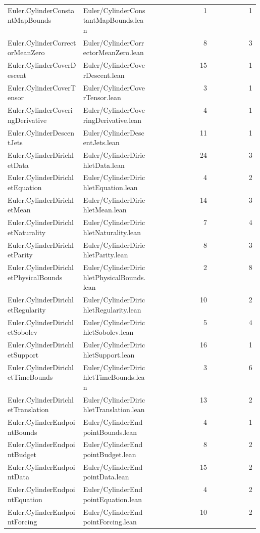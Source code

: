 \begin{longtable}{p{0.30\linewidth}p{0.28\linewidth}rr}
Euler.CylinderConstantMapBounds & Euler/CylinderConstantMapBounds.lean & 1 & 1\\
Euler.CylinderCorrectorMeanZero & Euler/CylinderCorrectorMeanZero.lean & 8 & 3\\
Euler.CylinderCoverDescent & Euler/CylinderCoverDescent.lean & 15 & 1\\
Euler.CylinderCoverTensor & Euler/CylinderCoverTensor.lean & 3 & 1\\
Euler.CylinderCoveringDerivative & Euler/CylinderCoveringDerivative.lean & 4 & 1\\
Euler.CylinderDescentJets & Euler/CylinderDescentJets.lean & 11 & 1\\
Euler.CylinderDirichletData & Euler/CylinderDirichletData.lean & 24 & 3\\
Euler.CylinderDirichletEquation & Euler/CylinderDirichletEquation.lean & 4 & 2\\
Euler.CylinderDirichletMean & Euler/CylinderDirichletMean.lean & 14 & 3\\
Euler.CylinderDirichletNaturality & Euler/CylinderDirichletNaturality.lean & 7 & 4\\
Euler.CylinderDirichletParity & Euler/CylinderDirichletParity.lean & 8 & 3\\
Euler.CylinderDirichletPhysicalBounds & Euler/CylinderDirichletPhysicalBounds.lean & 2 & 8\\
Euler.CylinderDirichletRegularity & Euler/CylinderDirichletRegularity.lean & 10 & 2\\
Euler.CylinderDirichletSobolev & Euler/CylinderDirichletSobolev.lean & 5 & 4\\
Euler.CylinderDirichletSupport & Euler/CylinderDirichletSupport.lean & 16 & 1\\
Euler.CylinderDirichletTimeBounds & Euler/CylinderDirichletTimeBounds.lean & 3 & 6\\
Euler.CylinderDirichletTranslation & Euler/CylinderDirichletTranslation.lean & 13 & 2\\
Euler.CylinderEndpointBounds & Euler/CylinderEndpointBounds.lean & 4 & 1\\
Euler.CylinderEndpointBudget & Euler/CylinderEndpointBudget.lean & 8 & 2\\
Euler.CylinderEndpointData & Euler/CylinderEndpointData.lean & 15 & 2\\
Euler.CylinderEndpointEquation & Euler/CylinderEndpointEquation.lean & 4 & 2\\
Euler.CylinderEndpointForcing & Euler/CylinderEndpointForcing.lean & 10 & 2\\

\end{longtable}
